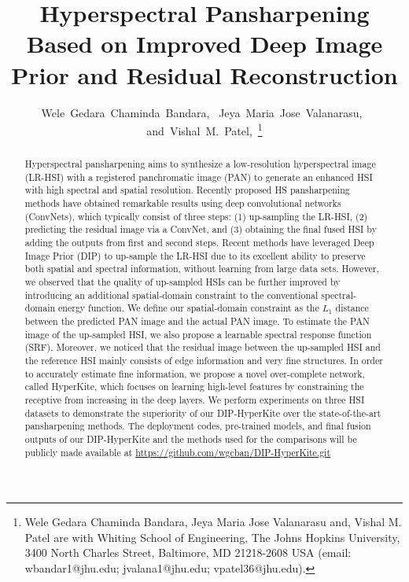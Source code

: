 \documentclass[journal]{IEEEtran}
\begin{document}
\title{Hyperspectral Pansharpening Based on Improved Deep Image Prior and  Residual Reconstruction}

\author{Wele~Gedara~Chaminda~Bandara,~
        Jeya~Maria~Jose~Valanarasu,~
        and~Vishal~M.~Patel,~\thanks{Wele Gedara Chaminda Bandara, Jeya Maria Jose Valanarasu and, Vishal M. Patel are with Whiting School of Engineering, The Johns Hopkins University, 3400 North Charles Street, Baltimore, MD 21218-2608 USA (email: wbandar1@jhu.edu; jvalana1@jhu.edu; vpatel36@jhu.edu).}}







\maketitle

\begin{abstract}
\par Hyperspectral pansharpening aims to synthesize a low-resolution hyperspectral image (LR-HSI) with a registered panchromatic image (PAN) to generate an enhanced HSI with high spectral and spatial resolution.  Recently proposed HS pansharpening methods have obtained remarkable results using deep convolutional networks (ConvNets), which typically consist of three steps: (1) up-sampling the LR-HSI, (2) predicting the residual image via a ConvNet, and (3) obtaining the final fused HSI by adding the outputs from first and second steps.  Recent methods have leveraged Deep Image Prior (DIP) to up-sample the LR-HSI due to its excellent ability to preserve both spatial and spectral information, without learning from  large data sets. However, we observed that the quality of up-sampled HSIs can be further improved by introducing an additional spatial-domain constraint to the conventional spectral-domain energy function. We define our spatial-domain constraint as the $L_1$ distance between the predicted PAN image and the actual PAN image. To estimate the PAN image of the up-sampled HSI, we also propose a learnable spectral response function (SRF). Moreover, we noticed that the residual image between the up-sampled HSI and the reference HSI mainly consists of edge information and very fine structures. In order to accurately estimate fine information, we propose a novel over-complete network, called HyperKite, which focuses on learning high-level features by constraining the receptive from increasing in the deep layers. We perform experiments on three HSI datasets to demonstrate the superiority of our DIP-HyperKite over the state-of-the-art pansharpening methods. The deployment codes, pre-trained models, and final fusion outputs of our DIP-HyperKite and the methods used for the comparisons will be publicly made available at \url{https://github.com/wgcban/DIP-HyperKite.git}
\end{abstract}
\end{document}
